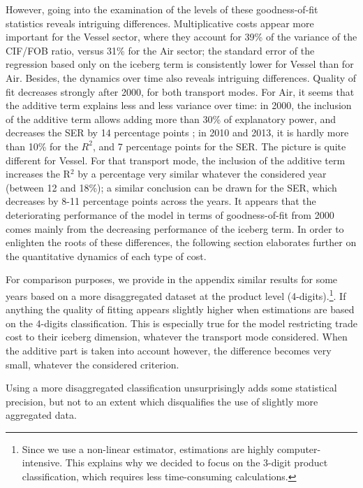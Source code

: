 \documentclass[a4paper,11pt]{article}
\begin{document}
However, going into the examination of the levels of these goodness-of-fit statistics reveals intriguing differences. Multiplicative costs appear more important for the Vessel sector, where they account for 39\% of the variance of the CIF/FOB ratio, versus 31\% for the Air sector; the standard error of the regression based only on the iceberg term is consistently lower for Vessel than for Air. Besides, the dynamics over time also reveals intriguing differences. Quality of fit decreases strongly after 2000, for both transport modes. For Air, it seems that the additive term explains less and less variance over time: in 2000, the inclusion of the additive term allows adding more than 30\% of explanatory power, and decreases the SER by 14 percentage points ;  in 2010 and 2013, it is hardly more than 10\% for the $R^{2}$, and 7 percentage points for the SER. The picture is quite different for Vessel. For that transport mode, the inclusion of the additive term increases the R$^{2}$ by a percentage very similar whatever the considered year (between 12 and 18\%); a similar conclusion can be drawn for the SER, which decreases by 8-11 percentage points across the years. It appears that the deteriorating performance of the model in terms of goodness-of-fit from 2000 comes mainly from the decreasing performance of the iceberg term. In order to enlighten the roots of these differences, the following section elaborates further on the quantitative dynamics of each type of cost.

For comparison purposes, we provide in the appendix similar results for some years based on a more disaggregated dataset at the product level (4-digits).\footnote{Since we use a non-linear estimator, estimations are highly computer-intensive. This explains why we decided to focus on the 3-digit product classification, which requires less time-consuming calculations.}. If anything the quality of fitting appears slightly higher when estimations are based on the 4-digits classification. This is especially true for the model restricting trade cost to their iceberg dimension, whatever the transport mode considered. When the additive part is taken into account however, the difference becomes very small, whatever the considered criterion.

Using a more disaggregated classification unsurprisingly adds some statistical precision, but not to an extent which disqualifies the use of slightly more aggregated data.
\end{document}
